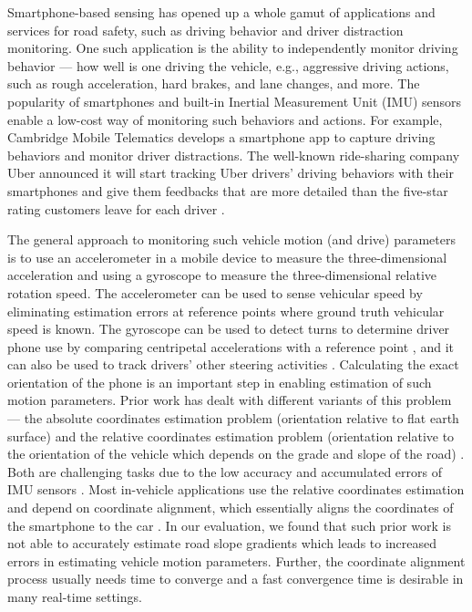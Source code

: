 

Smartphone-based sensing has opened up a whole gamut of applications and services
for road safety, such as driving behavior and driver distraction monitoring. 
One such application is the ability to independently monitor driving behavior --- how well is one
driving the vehicle, e.g., aggressive driving actions, such as rough acceleration, hard brakes, and lane changes, and more.
The popularity of smartphones and built-in Inertial Measurement Unit (IMU) sensors enable
a low-cost way of monitoring such behaviors and actions.
For example, Cambridge Mobile Telematics \cite{cmt} 
develops a smartphone
app to capture driving behaviors and monitor driver
distractions.
The well-known ride-sharing company Uber announced
it will start tracking Uber drivers' driving behaviors
with their smartphones and give them feedbacks that are more detailed than 
the five-star rating customers leave for each driver \cite{uber}.

The general approach to monitoring such vehicle motion (and drive) parameters is to use an accelerometer in a mobile device
 to measure the three-dimensional acceleration
and using a gyroscope to measure the three-dimensional relative rotation speed.
The accelerometer can be used to sense vehicular speed \cite{hansenspeed}
by eliminating estimation errors at reference points where 
ground truth vehicular speed is known.
The gyroscope can be used to detect turns to determine
driver phone use by comparing centripetal accelerations with 
a reference point \cite{wang2013sensing}, 
and it can also be used to track drivers' 
other steering activities \cite{chen2015invisible}.
Calculating the exact orientation of the phone is an important step in enabling estimation of such motion parameters.
Prior work has dealt with different variants of this problem ---  the absolute coordinates estimation problem (orientation relative
to flat earth surface)  \cite{zhou2014use}
and the relative coordinates estimation problem (orientation relative to the orientation of the vehicle which depends on 
the grade and slope of the road) \cite{wang2013sensing, chen2015invisible}.
Both are challenging tasks due to the low accuracy 
and accumulated errors of IMU sensors \cite{zhou2014use}.
Most in-vehicle applications use the relative coordinates estimation 
and depend on coordinate alignment,
which essentially aligns the coordinates of the smartphone to the car \cite{wang2013sensing, chen2015invisible, hansenspeed}. 
In our evaluation, we found that such prior work is not able to accurately estimate
road slope gradients which leads to increased errors in estimating vehicle motion
parameters. Further, the coordinate alignment process usually needs time to
converge and a fast convergence time is desirable in many real-time settings.

